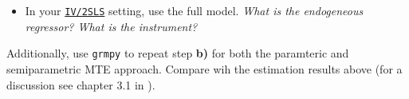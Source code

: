 \begin{boenumerate}
\begin{itemize}
  	\item In your \href{https://bashtage.github.io/linearmodels/doc/iv/introduction.html}{\texttt{IV/2SLS}} setting, use the full model. \emph{What is the endogeneous regressor? What is the instrument?}
  \end{itemize} 
  
  Additionally, use \texttt{grmpy} to repeat step \textbf{b)} for both the paramteric and semiparametric MTE approach. Compare wih the estimation results above (for a discussion see chapter 3.1 in \cite{Heckman.2007f}).
  

\end{boenumerate}

\nocite{grmpy-1.0}





